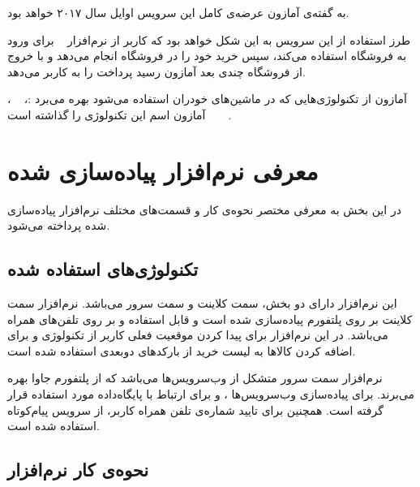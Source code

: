 \documentclass[oneside]{report}
\begin{document}
 	به گفته‌ی آمازون	عرضه‌ی کامل این سرویس اوایل سال ۲۰۱۷ خواهد بود. 
 		
 		طرز استفاده از این سرویس به این شکل خواهد بود که کاربر از نرم‌افزار 
 		 		{\normalsize {}} 		
 برای ورود به فروشگاه استفاده می‌کند،  سپس خرید خود را در فروشگاه انجام می‌دهد و با خروج از فروشگاه چندی بعد آمازون رسید پرداخت را به کاربر می‌دهد.

آمازون	از تکنولوژی‌هایی که در ماشین‌های خودران
 استفاده می‌شود بهره می‌برد :{\normalsize {}}،
 					 				{\normalsize {}}،
 					 					{\normalsize {}}
 					 					 
 \noindent
 آمازون اسم این تکنولوژی را 
 	{\normalsize {}}
 	گذاشته است
 	\cite{amazongo}.
 			 			 		
 			 			 			 				 			 			 	 
  	\section{معرفی نرم‌‌افزار پیاده‌سازی شده}
   در این بخش به معرفی مختصر نحوه‌ی کار و قسمت‌های مختلف نرم‌افزار پیاده‌سازی شده  پرداخته می‌شود. 
   
   		   \subsection{تکنولوژی‌های استفاده شده}
   		 این نرم‌افزار  دارای دو بخش، سمت کلاینت و سمت سرور می‌باشد. نرم‌افزار سمت کلاینت بر روی پلتفورم 
   		 {\normalsize{}}
   		 پیاده‌سازی شده است  و قابل استفاده و بر روی تلفن‌های همراه 
   		 {\normalsize{}}
   		 می‌باشد. در این نرم‌افزار برای پیدا کردن موقعیت فعلی کاربر از تکنولوژی 
   		 {\normalsize{}}
   		و برای اضافه کردن کالا‌ها به لیست خرید از بارکد‌های دوبعدی استفاده شده است. 
   		 
   		  نرم‌افزار سمت سرور متشکل‌ از وب‌سرویس‌ها می‌باشد که از پلتفورم جاوا بهره می‌برند.  
   		  برای پیاده‌سازی وب‌سرویس‌ها ،
   		     		 {\normalsize{}}
   		     		 و برای ارتباط با پایگاه‌داده  
   		     		    		 {\normalsize{}}
   		     		    		 مورد استفاده قرار گرفته است.
   		  همچنین برای تایید شماره‌ی تلفن همراه کاربر،  از  سرویس پیام‌کوتاه استفاده شده است.
   		  
		   \subsection{نحوه‌ی کار نرم‌افزار}
\end{document}
